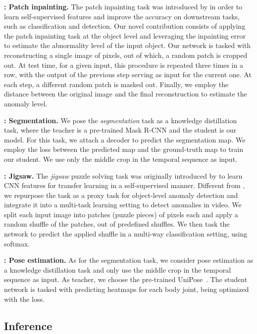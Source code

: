 \documentclass[times,twocolumn,final,authoryear]{elsarticle}
\begin{document}
\noindent
{\bf : Patch inpainting.}
The patch inpainting task was introduced by \cite{Pathak-CVPR-2016} in order to learn self-supervised features and improve the accuracy on downstream tasks, such as classification and detection. Our novel contribution consists of applying the patch inpainting task at the object level and leveraging the inpainting error to estimate the abnormality level of the input object. 
Our network is tasked with reconstructing a single image of  pixels, out of which, a random patch is cropped out. At test time, for a given input, this procedure is repeated three times in a row, with the output of the previous step serving as input for the current one. At each step, a different random patch is masked out. Finally, we employ the  distance between the original image and the final reconstruction to estimate the anomaly level. 

\noindent
{\bf : Segmentation.}
We pose the \emph{segmentation} task as a knowledge distillation task, where the teacher is a pre-trained Mask R-CNN \citep{He-ICCV-2017} and the student is our model. For this task, we attach a decoder to predict the segmentation map. We employ the  loss between the predicted map and the ground-truth map to train our student. We use only the middle crop in the temporal sequence as input.

\noindent
{\bf : Jigsaw.}
The \emph{jigsaw} puzzle solving task was originally introduced by \cite{Noroozi-ECCV-2016} to learn CNN features for transfer learning in a self-supervised manner. Different from \cite{Noroozi-ECCV-2016}, we repurpose the task as a proxy task for object-level anomaly detection and integrate it into a multi-task learning setting to detect anomalies in video.
We split each input image into  patches (puzzle pieces) of  pixels each and apply a random shuffle of the patches, out of  predefined shuffles. We then task the network to predict the applied shuffle in a multi-way classification setting, using softmax.



\noindent
{\bf : Pose estimation.}
As for the segmentation task, we consider pose estimation as a knowledge distillation task and only use the middle crop in the temporal sequence as input. As teacher, we choose the pre-trained UniPose~\citep{Artacho-CVPR-2020}. The student network is tasked with predicting heatmaps for each body joint, being optimized with the  loss.


\subsection{Inference}
\end{document}
